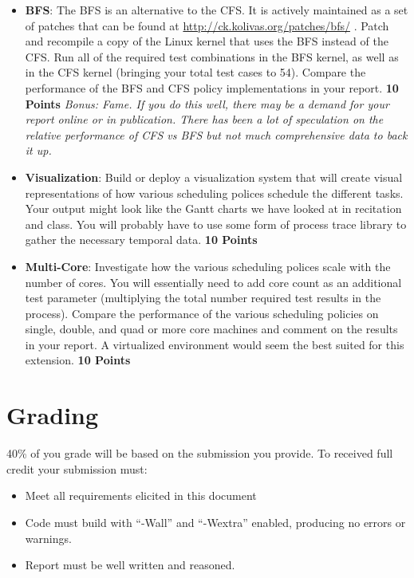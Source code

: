 \documentclass[12pt]{article}
\begin{document}
\begin{itemize}
\item {\bf BFS}: The BFS is an alternative to the
  CFS. It is actively maintained as a set of patches that
  can be found at
  \url{http://ck.kolivas.org/patches/bfs/}
  \cite{Kolivas-BFS,Kolivas-BFSFAQ}. Patch
  and recompile a copy of the Linux kernel that uses the BFS instead
  of the CFS. Run all of the required test combinations in the BFS
  kernel, as well as in the CFS kernel (bringing your total test cases
  to 54). Compare the performance of the BFS and CFS policy
  implementations in your
  report. {\bf 10 Points} \emph{Bonus: Fame. If you do this well, there may
  be a demand for your report online or in publication. There has been
  a lot of speculation on the relative performance of CFS vs BFS but not
  much comprehensive data to back it up.}
\item {\bf Visualization}: Build or deploy a visualization system that
  will create visual representations of how various scheduling polices
  schedule the different tasks. Your output might look like the
  Gantt charts we have looked at in recitation and class. You will
  probably have to use some form of process trace library to gather the
  necessary temporal data. {\bf 10 Points}
\item {\bf Multi-Core}: Investigate how the various scheduling polices
  scale with the number of cores. You will essentially need to add core
  count as an additional test parameter (multiplying the total number
  required test
  results in the process). Compare the performance of the various
  scheduling policies on single, double, and quad or more core machines and
  comment on the results in your report. A virtualized environment
  would seem the best suited for this extension. {\bf 10 Points}
\end{itemize}

\section{Grading}

40\% of you grade will be based on the submission you provide.
To received full credit your submission must:
\begin{itemize}
\item Meet all requirements elicited in this document
\item Code must build with ``-Wall'' and ``-Wextra'' enabled,
  producing no errors or warnings.
\item Report must be well written and reasoned.
\end{itemize}
\end{document}
